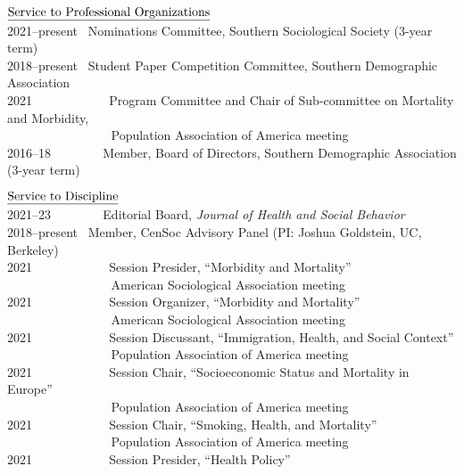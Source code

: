 \documentclass[11pt,]{article}
\begin{document}
\(\text{\underline{Service to Professional Organizations}}\)\\
2021--present ~Nominations Committee, Southern Sociological Society
(3-year term)\\
2018--present ~Student Paper Competition Committee, Southern Demographic
Association\\
2021 ~ ~ ~ ~ ~ ~ ~ Program Committee and Chair of Sub-committee on
Mortality and Morbidity,\\
\hspace*{0.333em} ~ ~ ~ ~ ~ ~ ~ ~ ~ ~ Population Association of America
meeting\\
2016--18 ~ ~ ~ ~ ~Member, Board of Directors, Southern Demographic
Association (3-year term)

\(\text{\underline{Service to Discipline}}\)\\
2021--23 ~ ~ ~ ~ ~Editorial Board, \emph{Journal of Health and Social
Behavior}\\
2018--present ~Member, CenSoc Advisory Panel (PI: Joshua Goldstein, UC,
Berkeley)\\
2021 ~ ~ ~ ~ ~ ~ ~ Session Presider, ``Morbidity and Mortality''\\
\hspace*{0.333em} ~ ~ ~ ~ ~ ~ ~ ~ ~ ~ American Sociological Association
meeting\\
2021 ~ ~ ~ ~ ~ ~ ~ Session Organizer, ``Morbidity and Mortality''\\
\hspace*{0.333em} ~ ~ ~ ~ ~ ~ ~ ~ ~ ~ American Sociological Association
meeting\\
2021 ~ ~ ~ ~ ~ ~ ~ Session Discussant, ``Immigration, Health, and Social
Context''\\
\hspace*{0.333em} ~ ~ ~ ~ ~ ~ ~ ~ ~ ~ Population Association of America
meeting\\
2021 ~ ~ ~ ~ ~ ~ ~ Session Chair, ``Socioeconomic Status and Mortality
in Europe''\\
\hspace*{0.333em} ~ ~ ~ ~ ~ ~ ~ ~ ~ ~ Population Association of America
meeting\\
2021 ~ ~ ~ ~ ~ ~ ~ Session Chair, ``Smoking, Health, and Mortality''\\
\hspace*{0.333em} ~ ~ ~ ~ ~ ~ ~ ~ ~ ~ Population Association of America
meeting\\
2021 ~ ~ ~ ~ ~ ~ ~ Session Presider, ``Health Policy''\\
\end{document}
